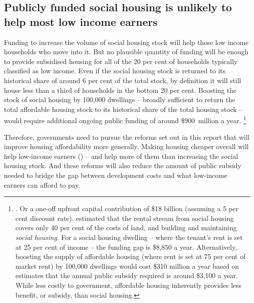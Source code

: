 \subsection{Publicly funded social housing is unlikely to help most low income earners}\label{subsec:Social-housing-is-unlikely-to-help}

Funding to increase the volume of social housing stock will help those low income households who move into it.
But no plausible quantity of funding will be enough to provide subsidised housing for all of the 20 per cent of households typically classified as low income.
Even if the social housing stock is returned to its historical share of around 6 per cent of the total stock, by definition it will still house less than a third of households in the bottom 20 per cent.
Boosting the stock of social housing by 100,000 dwellings -- broadly sufficient to return the total affordable housing stock to its historical share of the total housing stock -- would require additional ongoing public funding of around \$900~million a year.%
    \footnote{\textcites{Coates-Wiltshire-2018-InsideStory-conventional-wisdom-wrong}[][8]{Daley-etal-2017-Submission-Natl-housing-finance}.  Or a one-off upfront capital contribution of \$18 billion (assuming a 5 per cent discount rate). \textcite[][14]{Council-Fed-Fin-Relations-2016-Innovative-models-to-improve-supply-affordable-housing} estimated that the rental stream from social housing covers only 40 per cent of the costs of land, and building and maintaining \textit{social housing}.
    For a social housing dwelling -- where the tenant's rent is set at 25 per cent of income -- the funding gap is \$8,850 a year.
    Alternatively, boosting the supply of affordable housing (where rent is set at 75 per cent of market rent) by 100,000 dwellings would cost \$310 million a year based on estimates that the annual public subsidy required is around \$3,100 a year.
    While less costly to government, affordable housing inherently provides less benefit, or subsidy, than social housing.}
    
Therefore, governments need to pursue the reforms set out in this report that will improve housing affordability more generally.
Making housing cheaper overall will help low-income earners () -- and help more of them than increasing the social housing stock.
And these reforms will also reduce the amount of public subsidy needed to bridge the gap between development costs and what low-income earners can afford to pay.

